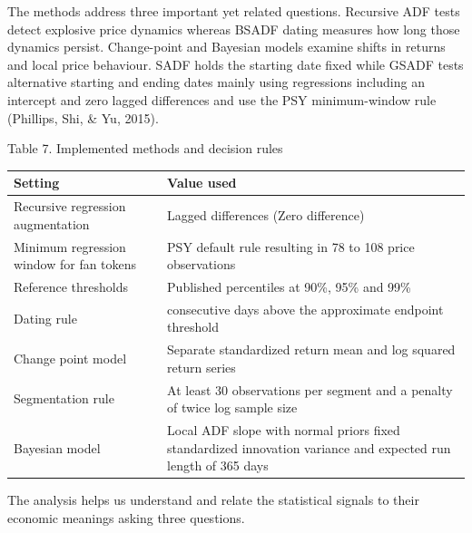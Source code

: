 \documentclass[11pt,a4paper,onecolumn]{article}
\newcommand{\reportcaption}[1]{{\small\raggedright #1\par}\nopagebreak\vspace{3pt}}
\begin{document}
The methods address three important yet related questions. Recursive ADF tests detect explosive price dynamics whereas BSADF dating measures how long those dynamics persist. Change-point and Bayesian models examine shifts in returns and local price behaviour. SADF holds the starting date fixed while GSADF tests alternative starting and ending dates mainly using regressions including an intercept and zero lagged differences and use the PSY minimum-window rule (Phillips, Shi, \& Yu, 2015).

\par\addvspace{5pt}\noindent\begin{minipage}{\linewidth}\reportcaption{Table 7. Implemented methods and decision rules}

\begingroup\small\renewcommand{\arraystretch}{1.18}\setlength{\tabcolsep}{4pt}
\noindent\begin{tabular}{|>{\raggedright\arraybackslash}p{0.371212\dimexpr\linewidth-4\tabcolsep-3\arrayrulewidth\relax}>{\raggedright\arraybackslash}p{0.628788\dimexpr\linewidth-4\tabcolsep-3\arrayrulewidth\relax}|}
\hline\rowcolor[HTML]{E8E8E8} \bfseries Setting & \bfseries Value used \\ \hline
Recursive regression augmentation & Lagged differences (Zero difference) \\ \hline
Minimum regression window for fan tokens & PSY default rule resulting in 78 to 108 price observations \\ \hline
Reference thresholds & Published percentiles at 90\%, 95\% and 99\% \\ \hline
Dating rule & 30 consecutive days above the approximate endpoint threshold \\ \hline
Change point model & Separate standardized return mean and log squared return series \\ \hline
Segmentation rule & At least 30 observations per segment and a penalty of twice log sample size \\ \hline
Bayesian model & Local ADF slope with normal priors fixed standardized innovation variance and expected run length of 365 days \\ \hline
\end{tabular}\endgroup\end{minipage}\par\addvspace{5pt}

The analysis helps us understand and relate the statistical signals to their economic meanings asking three questions.
\end{document}
